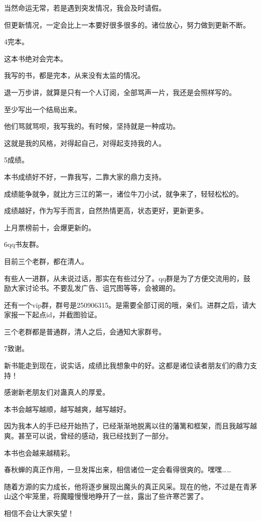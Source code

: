 \begin{this_body}
当然命运无常，若是遇到突发情况，我会及时请假。

但更新情况，一定会比上一本要好很多很多的。诸位放心，努力做到更新不断。

4完本。

这本书绝对会完本。

我写的书，都是完本，从来没有太监的情况。

退一万步讲，就算是只有一个人订阅，全部骂声一片，我还是会照样写的。

至少写出一个结局出来。

他们骂就骂呗，我写我的。有时候，坚持就是一种成功。

这就是我的风格，对得起自己，对得起支持我的人。

5成绩。

本书成绩好不好，一靠我写，二靠大家的鼎力支持。

成绩能争就争，就比方三江的第一，诸位牛刀小试，就争来了，轻轻松松的。

成绩越好，作为写手而言，自然热情更高，状态更好，更新更多。

上月票榜前十，会爆更新的。

6qq书友群。

目前三个老群，都在清人。

有些人一进群，从未说过话，那实在有些过分了。qq群是为了方便交流用的，鼓励大家讨论书。不要乱发广告、诅咒图等等，会被踢的。

还有一个vip群，群号是250906315。是需要全部订阅的哦，亲们。进群之后，请大家报一下起点id，并截图验证。

三个老群都是普通群，清人之后，会通知大家群号。

7致谢。

新书能走到现在，说实话，成绩比我想象中的好。这都是诸位读者朋友们的鼎力支持！

感谢新老朋友们对蛊真人的厚爱。

本书会越写越顺，越写越爽，越写越好。

因为我本人的手已经开始热了，已经渐渐地脱离以往的藩篱和框架，而且我越写越爽。甚至可以说，曾经的感动，我已经找到了一部分。

本书也会越来越精彩。

春秋蝉的真正作用，一旦发挥出来，相信诸位一定会看得很爽的。嘿嘿……

随着方源的实力成长，他将逐步展现出魔头的真正风采。现在的他，不过是在青茅山这个牢笼里，将魔瞳慢慢地睁开了一丝，露出了些许寒芒罢了。

相信不会让大家失望！

\end{this_body}

